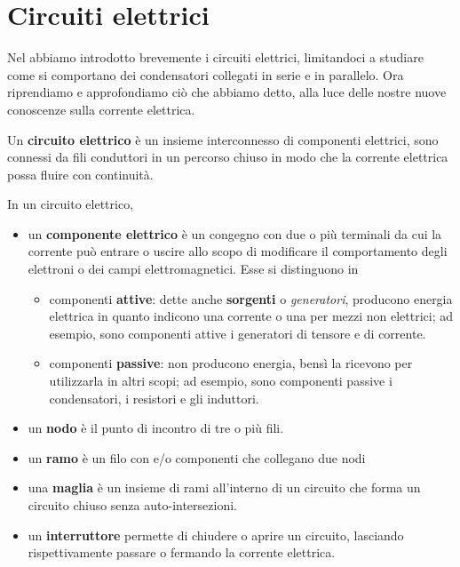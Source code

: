 \section{Circuiti elettrici}
Nel  abbiamo introdotto brevemente i circuiti elettrici, limitandoci a studiare come si comportano dei condensatori collegati in serie e in parallelo. Ora riprendiamo e approfondiamo ciò che abbiamo detto, alla luce delle nostre nuove conoscenze sulla corrente elettrica.
\begin{define}
	Un \textbf{circuito elettrico} è un insieme interconnesso di componenti elettrici, sono connessi da fili conduttori in un percorso chiuso in modo che la corrente elettrica possa fluire con continuità.
\end{define}
\begin{define}
	In un circuito elettrico,
	\begin{itemize}
		\item un \textbf{componente elettrico} è un congegno con due o più terminali da cui la corrente può entrare o uscire allo scopo di modificare il comportamento degli elettroni o dei campi elettromagnetici. Esse si distinguono in
		\begin{itemize}
			\item componenti \textbf{attive}: dette anche \textbf{sorgenti} o \textit{generatori}, producono energia elettrica in quanto indicono una corrente o una \ddp per mezzi non elettrici; ad esempio, sono componenti attive i generatori di tensore e di corrente.
			\item componenti \textbf{passive}: non producono energia, bensì la ricevono per utilizzarla in altri scopi; ad esempio, sono componenti passive  i condensatori, i resistori e gli induttori. 
		\end{itemize}
		\item un \textbf{nodo} è il punto di incontro di tre o più fili.
		\item un \textbf{ramo} è un filo con e/o componenti che collegano due nodi 
		\item una \textbf{maglia} è un insieme di rami all'interno di un circuito che forma un circuito chiuso senza auto-intersezioni.
		\item un \textbf{interruttore} permette di chiudere o aprire un circuito, lasciando rispettivamente passare o fermando la corrente elettrica.
	\end{itemize}
\end{define}
